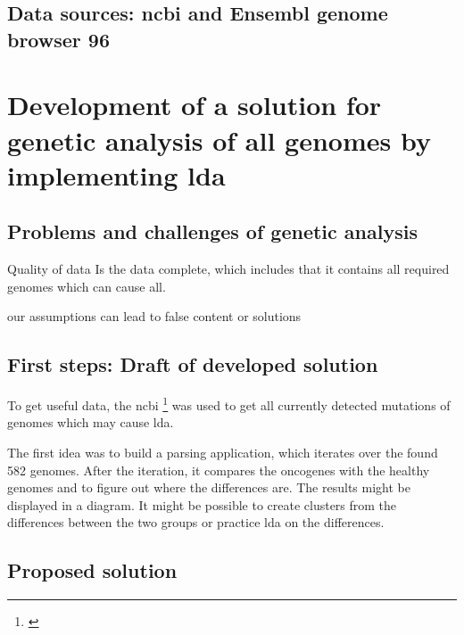 \section{Data sources: \gls{ncbi} and Ensembl genome browser 96}\label{datasources}

\chapter{Development of a solution for genetic analysis of \gls{all} genomes by implementing \gls{lda}}\label{development}
\section{Problems and challenges of genetic analysis}\label{problems_challenges}
Quality of data 
Is the data complete, which includes that it contains all required genomes which can cause \gls{all}.

our assumptions can lead to false content or solutions 

\section{First steps: Draft of developed solution}\label{draft}

To get useful data, the \gls{ncbi} \footnote{\autocite{ncbi}} was used to get all currently detected mutations of genomes which may cause \gls{lda}.

The first idea was to build a parsing application, which iterates over the found 582 genomes. After the iteration, it compares the oncogenes with the healthy genomes and to figure out where the differences are. The results might be displayed in a diagram. It might be possible to create clusters from the differences between the two groups or practice \gls{lda} on the differences.

\section{Proposed solution}\label{proposed_solution}

